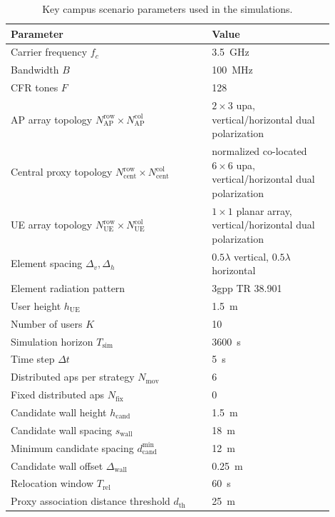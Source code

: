 \begin{table}[t]
    \centering
    \caption{Key campus scenario parameters used in the simulations.}
    \label{tab:rabot_setup}
    \begin{tabular}{p{0.56\linewidth}p{0.34\linewidth}}
        \toprule
        Parameter & Value \\
        \midrule
        Carrier frequency $f_c$ & \SI{3.5}{\giga\hertz} \\
        Bandwidth $B$ & \SI{100}{\mega\hertz} \\
        CFR tones $F$ & \num{128} \\
        AP array topology $N_{\mathrm{AP}}^{\mathrm{row}}\times N_{\mathrm{AP}}^{\mathrm{col}}$ & $\num{2} \times \num{3}$ \gls{upa}, vertical/horizontal dual polarization \\
        Central proxy topology $N_{\mathrm{cent}}^{\mathrm{row}}\times N_{\mathrm{cent}}^{\mathrm{col}}$ & normalized co-located $\num{6} \times \num{6}$ \gls{upa}, vertical/horizontal dual polarization \\
        UE array topology $N_{\mathrm{UE}}^{\mathrm{row}}\times N_{\mathrm{UE}}^{\mathrm{col}}$ & $\num{1} \times \num{1}$ planar array, vertical/horizontal dual polarization \\
        Element spacing $\Delta_v,\Delta_h$ & $0.5\lambda$ vertical, $0.5\lambda$ horizontal \\
        Element radiation pattern & \gls{3gpp} TR 38.901 \\
        User height $h_{\mathrm{UE}}$ & \SI{1.5}{\meter} \\
        Number of users $K$ & \num{10} \\
        Simulation horizon $T_{\mathrm{sim}}$ & \SI{3600}{\second} \\
        Time step $\Delta t$ & \SI{5}{\second} \\
        Distributed \glspl{ap} per strategy $N_{\mathrm{mov}}$ & \num{6} \\
        Fixed distributed \glspl{ap} $N_{\mathrm{fix}}$ & \num{0} \\
        Candidate wall height $h_{\mathrm{cand}}$ & \SI{1.5}{\meter} \\
        Candidate wall spacing $s_{\mathrm{wall}}$ & \SI{18}{\meter} \\
        Minimum candidate spacing $d_{\mathrm{cand}}^{\min}$ & \SI{12}{\meter} \\
        Candidate wall offset $\Delta_{\mathrm{wall}}$ & \SI{0.25}{\meter} \\
        Relocation window $T_{\mathrm{rel}}$ & \SI{60}{\second} \\
        Proxy association distance threshold $d_{\mathrm{th}}$ & \SI{25}{\meter} \\
        \bottomrule
    \end{tabular}
\end{table}

